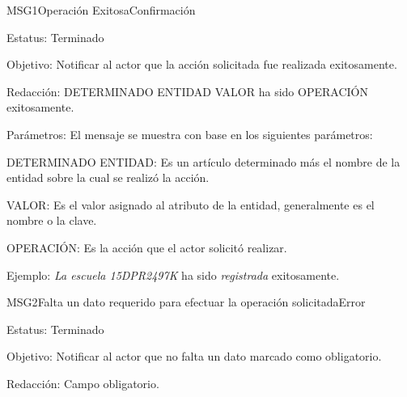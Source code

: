 \begin{mensaje}{MSG1}{Operación Exitosa}{Confirmación}
    \item[Estatus:] Terminado
    \item[Objetivo:] Notificar al actor que la acción solicitada fue realizada exitosamente.
    \item[Redacción:] DETERMINADO ENTIDAD VALOR ha sido OPERACIÓN exitosamente.
    \item[Parámetros:] El mensaje se muestra con base en los siguientes parámetros:
    \begin{Citemize}
	\item DETERMINADO ENTIDAD: Es un artículo determinado más el nombre de la entidad sobre la cual se realizó la acción.
	\item VALOR: Es el valor asignado al atributo de la entidad, generalmente es el nombre o la clave.
	\item OPERACIÓN: Es la acción que el actor solicitó realizar.
    \end{Citemize}
    \item[Ejemplo:] {\em La escuela 15DPR2497K} ha sido {\em registrada} exitosamente.
\end{mensaje}

\begin{mensaje}{MSG2}{Falta un dato requerido para efectuar la operación solicitada}{Error}
	\item[Estatus:] Terminado
	\item[Objetivo:] Notificar al actor que no falta un dato marcado como obligatorio.
	\item[Redacción:] Campo obligatorio.
\end{mensaje}

